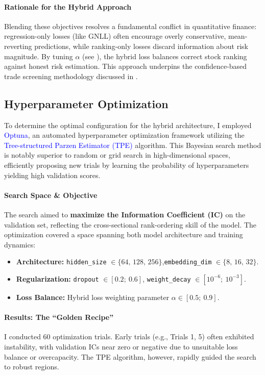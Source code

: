 \documentclass[twoside,final]{hcmut-report}
\newcommand{\result}[1]{\fcolorbox{red}{white}{#1}}
\begin{document}
\paragraph{Rationale for the Hybrid Approach}
Blending these objectives resolves a fundamental conflict in quantitative finance: regression-only losses (like GNLL) often encourage overly conservative, mean-reverting predictions, while ranking-only losses discard information about risk magnitude. By tuning $\alpha$ (see \result{Section~\ref{section_4.3}}), the hybrid loss balances correct stock ranking against honest risk estimation. This approach underpins the confidence-based trade screening methodology discussed in \result{Section~\ref{section_4.1.4}}.

\subsection{Hyperparameter Optimization}
\label{section_4.3}
To determine the optimal configuration for the hybrid architecture, I employed \textcolor{blue}{Optuna}, an automated hyperparameter optimization framework utilizing the \textcolor{blue}{Tree-structured Parzen Estimator (TPE)} algorithm. This Bayesian search method is notably superior to random or grid search in high-dimensional spaces, efficiently proposing new trials by learning the probability of hyperparameters yielding high validation scores.

\paragraph{Search Space \& Objective}
The search aimed to \textbf{maximize the Information Coefficient (IC)} on the validation set, reflecting the cross-sectional rank-ordering skill of the model. The optimization covered a space spanning both model architecture and training dynamics:
\begin{itemize}
  \item \textbf{Architecture:} \texttt{hidden\_size} $\in \{64,\,128,\,256\}$,\quad \texttt{embedding\_dim} $\in \{8,\,16,\,32\}$.
  \item \textbf{Regularization:} \texttt{dropout} $\in[0.2;~0.6]$, \texttt{weight\_decay} $\in[10^{-6};~10^{-3}]$.
  \item \textbf{Loss Balance:} Hybrid loss weighting parameter $\alpha \in[0.5;~0.9]$.
\end{itemize}

\paragraph{Results: The ``Golden Recipe''}
I conducted 60 optimization trials. Early trials (e.g., Trials 1, 5) often exhibited instability, with validation ICs near zero or negative due to unsuitable loss balance or overcapacity. The TPE algorithm, however, rapidly guided the search to robust regions.
\end{document}
